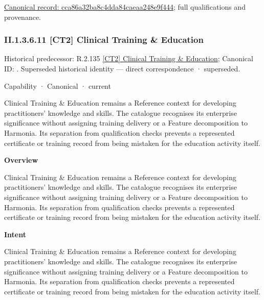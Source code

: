 {\footnotesize \href{../../../../../../../continuum/strategy/capability/cca86a32ba8c4dda84caeaa248e9f444.md}{Canonical record: cca86a32ba8c4dda84caeaa248e9f444}; full qualifications and provenance.}\par
\subsubsection*{II.1.3.6.11 [CT2] Clinical Training \& Education}
\label{navigation:II.1.3.6.11}

{\small Historical predecessor: R.2.135 \hyperref[element:df8bff7df9c1469da16cac6a5eb2bf76]{[CT2] Clinical Training \& Education}; Canonical ID: \texttt{}. Superseded historical identity — direct correspondence · superseded.}\par
\label{element:d016f35ffbc345d99d7281e968c14ddb}
{\small Capability · Canonical · current}\par

Clinical Training \& Education remains a Reference context for developing practitioners' knowledge and skills. The catalogue recognises its enterprise significance without assigning training delivery or a Feature decomposition to Harmonia. Its separation from qualification checks prevents a represented certificate or training record from being mistaken for the education activity itself.



\textbf{Overview}



Clinical Training \& Education remains a Reference context for developing practitioners' knowledge and skills. The catalogue recognises its enterprise significance without assigning training delivery or a Feature decomposition to Harmonia. Its separation from qualification checks prevents a represented certificate or training record from being mistaken for the education activity itself.



\textbf{Intent}



Clinical Training \& Education remains a Reference context for developing practitioners' knowledge and skills. The catalogue recognises its enterprise significance without assigning training delivery or a Feature decomposition to Harmonia. Its separation from qualification checks prevents a represented certificate or training record from being mistaken for the education activity itself.



